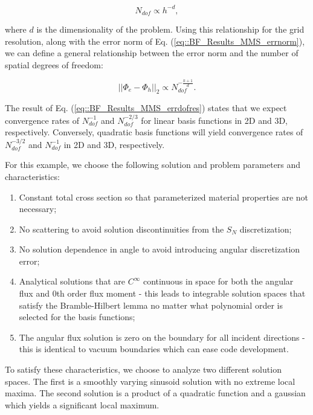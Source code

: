 \begin{equation}
\label{eq::BF_Results_MMS_dofres}
N_{dof} \propto h^{-d} ,
\end{equation}

\noindent where $d$ is the dimensionality of the problem. Using this relationship for the grid resolution, along with the error norm of Eq. (\ref{eq::BF_Results_MMS_errnorm}), we can define a general relationship between the error norm and the number of spatial degrees of freedom:

\begin{equation}
\label{eq::BF_Results_MMS_errdofres}
|| \Phi_{e} - \Phi_h || _{2}  \propto N_{dof}^{- \frac{k+1}{d}} .
\end{equation}

\noindent The result of Eq. (\ref{eq::BF_Results_MMS_errdofres}) states that we expect convergence rates of $N_{dof}^{-1}$ and $N_{dof}^{-2/3}$ for linear basis functions in 2D and 3D, respectively. Conversely, quadratic basis functions will yield convergence rates of $N_{dof}^{-3/2}$ and $N_{dof}^{-1}$ in 2D and 3D, respectively.

For this example, we choose the following solution and problem parameters and characteristics:

\begin{enumerate}
	\item Constant total cross section so that parameterized material properties are not necessary;
	\item No scattering to avoid solution discontinuities from the $S_N$ discretization;
	\item No solution dependence in angle to avoid introducing angular discretization error;
	\item Analytical solutions that are $C^{\infty}$ continuous in space for both the angular flux and 0th order flux moment - this leads to integrable solution spaces that satisfy the Bramble-Hilbert lemma no matter what polynomial order is selected for the basis functions;
	\item The angular flux solution is zero on the boundary for all incident directions - this is identical to vacuum boundaries which can ease code development.
\end{enumerate}

\noindent To satisfy these characteristics, we choose to analyze two different solution spaces. The first is a smoothly varying sinusoid solution with no extreme local maxima. The second solution is a product of a quadratic function and a gaussian which yields a significant local maximum. 

